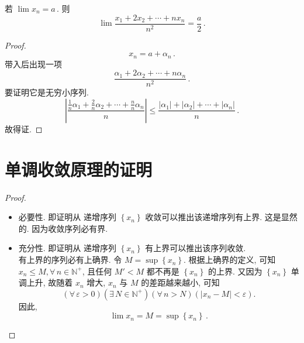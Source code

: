 \documentclass{book}
\newcommand{\Exists}{\exists\,}
\newcommand{\Any}{\forall\,}
\newcommand{\set}[1]{\left\{#1\right\}}
\newcommand{\abs}[1]{\left\lvert #1 \right\rvert}
\newcommand{\N}{\mathbb{N}}
\renewcommand{\le}{\leqslant}
\numberwithin{equation}{section}
\numberwithin{figure}{section}
\theoremstyle{definition}
\begin{document}
若 $\lim x_n=a$\,. 则
\begin{equation*}
  \lim\frac{x_1+2x_2+\cdots+nx_n}{n^2}=\frac{a}{2}\,.
\end{equation*}
\begin{proof}
  \begin{equation*}
    x_n=a+\alpha_n\,.
  \end{equation*}
  带入后出现一项
  \begin{equation*}
    \frac{\alpha_1+2\alpha_2+\cdots+n\alpha_n}{n^2}\,.
  \end{equation*}
  要证明它是无穷小序列.
  \begin{equation*}
    \abs{\frac{\frac{1}{n}\alpha_1+\frac{2}{n}\alpha_2+\cdots+\frac{n}{n}\alpha_n}{n}}\le\frac{\abs{\alpha_1}+\abs{\alpha_2}+\cdots+\abs{\alpha_n}}{n}\,.
  \end{equation*}
  故得证.
\end{proof}

\section{单调收敛原理的证明}
\label{proof:monotonicSequenceHasLimit}
\begin{proof}
  \leavevmode

  \begin{itemize}
    \item 必要性. 即证明从
  递增序列 $\set{x_n}$ 收敛可以推出该递增序列有上界.
  这是显然的. 因为收敛序列必有界.
    \item 充分性. 即证明从
  递增序列 $\set{x_n}$ 有上界可以推出该序列收敛.\\
  有上界的序列必有上确界. 令 $M=\sup\set{x_n}$. 根据上确界的定义, 可知 $x_n\le M,\Any n\in\N^+$, 且任何 $M'<M$ 都不再是 $\set{x_n}$ 的上界. 又因为 $\set{x_n}$ 单调上升, 故随着 $x_n$ 增大, $x_n$ 与 $M$ 的差距越来越小, 可知
  \begin{equation*}
    (\Any \varepsilon>0)(\Exists N\in\N^+)(\Any n>N)(\abs{x_n-M}<\varepsilon).
  \end{equation*}
  因此,
  \begin{equation*}
    \lim x_n=M=\sup\set{x_n}\,.
  \end{equation*}
  \end{itemize}
\end{proof}
\end{document}
